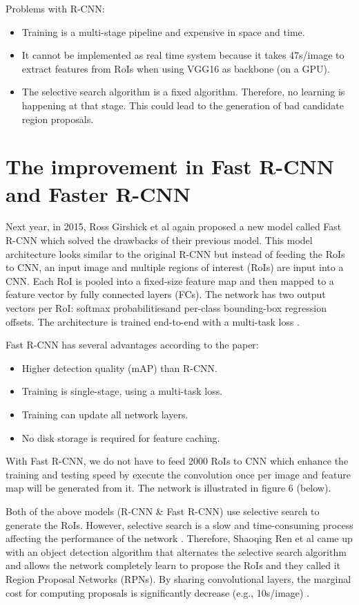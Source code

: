 	
	Problems with R-CNN:
	\begin{itemize}
		\item Training is a multi-stage pipeline and expensive in space and time.
		\item It cannot be implemented as real time system because it takes 47s/image to extract features from RoIs when using VGG16 as backbone (on a GPU).
		\item The selective search algorithm is a fixed algorithm. Therefore, no learning is happening at that stage. This could lead to the generation of bad candidate region proposals.
	\end{itemize}

\section{The improvement in Fast R-CNN and Faster R-CNN}
\label{section:fastandfasterrcnn}
\noindent
	
	Next year, in 2015, Ross Girshick et al again proposed a new model called Fast R-CNN which solved the drawbacks of their previous model. This model architecture looks similar to the original R-CNN but instead of feeding the RoIs to CNN, an input image and multiple regions of interest (RoIs) are input into a CNN. Each RoI is pooled into a fixed-size feature map and then mapped to a feature vector by fully connected layers (FCs). The network has two output vectors per RoI: softmax probabilitiesand per-class bounding-box regression offsets. The architecture is trained end-to-end with a multi-task loss \cite{fastrcnn}.
	
	Fast R-CNN has several advantages according to the paper:
	\begin{itemize}
		\item Higher detection quality (mAP) than R-CNN.
		\item Training is single-stage, using a multi-task loss.
		\item Training can update all network layers.
		\item No disk storage is required for feature caching.
	\end{itemize}
	
	With Fast R-CNN, we do not have to feed 2000 RoIs to CNN which enhance the training and testing speed by execute the convolution once per image and feature map will be generated from it. The network is illustrated in figure 6 (below).
	
	Both of the above models (R-CNN \& Fast R-CNN) use selective search to generate the RoIs. However, selective search is a slow and time-consuming process affecting the performance of the network \cite{fasterrcnn}. Therefore, Shaoqing Ren et al came up with an object detection algorithm that alternates the selective search algorithm and allows the network completely learn to propose the RoIs and they called it Region Proposal Networks (RPNs). By sharing convolutional layers, the marginal cost for computing proposals is significantly decrease (e.g., 10s/image) \cite{fasterrcnn}.
	
